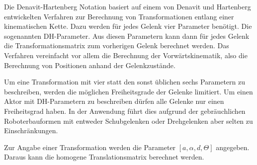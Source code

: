 \label{dh-p}

Die Denavit-Hartenberg Notation basiert auf einem von Denavit und Hartenberg 
entwickelten Verfahren zur Berechnung von Transformationen entlang einer 
kinematischen Kette. Dazu werden für jedes 
Gelenk vier Parameter benötigt. Die sogenannten \ac{DH-Parameter}. Aus diesen
Parametern kann dann für jedes Gelenk die Transformationsmatrix zum vorherigen 
Gelenk berechnet werden. Das Verfahren vereinfacht vor allem die Berechnung 
der Vorwärtskinematik, also die Berechnung von Positionen anhand der 
Gelenkzustände. 

Um eine Transformation mit vier statt den sonst üblichen 
sechs Parametern zu beschreiben, werden die möglichen Freiheitsgrade der Gelenke
limitiert. Um einen Aktor mit \ac{DH-Parameter}n zu beschreiben dürfen alle
Gelenke nur einen Freiheitsgrad haben. In der Anwendung führt dies aufgrund der gebräuchlichen Roboterbauformen
mit entweder Schubgelenken oder Drehgelenken aber selten zu Einschränkungen.

Zur Angabe einer Transformation werden die 
Parameter $[a, \alpha, d, \Theta]$ angegeben. Daraus kann die homogene 
Translationsmatrix berechnet werden.\cite{craig2005}
